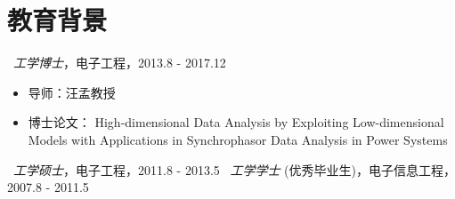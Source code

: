 \documentclass{resume}
\begin{document}


 

\section{教育背景}
\ \textit{工学博士}，电子工程，{2013.8 - 2017.12}
\begin{itemize}
	\item 导师：汪孟教授
	\item  博士论文： High-dimensional Data Analysis by Exploiting Low-dimensional Models with Applications in Synchrophasor Data Analysis in Power Systems
\end{itemize}
\ \textit{工学硕士}，电子工程，{2011.8 - 2013.5}
\ \textit{工学学士} (优秀毕业生)，电子信息工程，{2007.8 - 2011.5}

\end{document}
